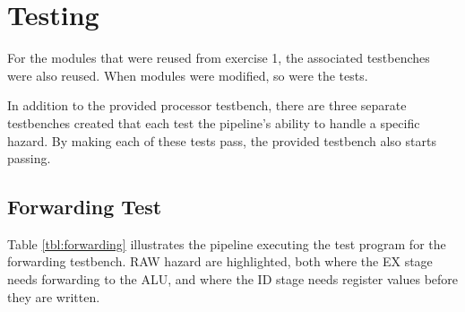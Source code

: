 \section{Testing}
For the modules that were reused from exercise 1,
the associated testbenches were also reused.
When modules were modified,
so were the tests.

In addition to the provided processor testbench,
there are three separate testbenches created that each test the pipeline's ability to handle a specific hazard.
By making each of these tests pass, the provided testbench also starts passing.

\subsection{Forwarding Test}
Table \ref{tbl:forwarding} illustrates the pipeline executing the test program for the forwarding testbench.
RAW hazard are highlighted,
both where the EX stage needs forwarding to the ALU,
and where the ID stage needs register values before they are written.

